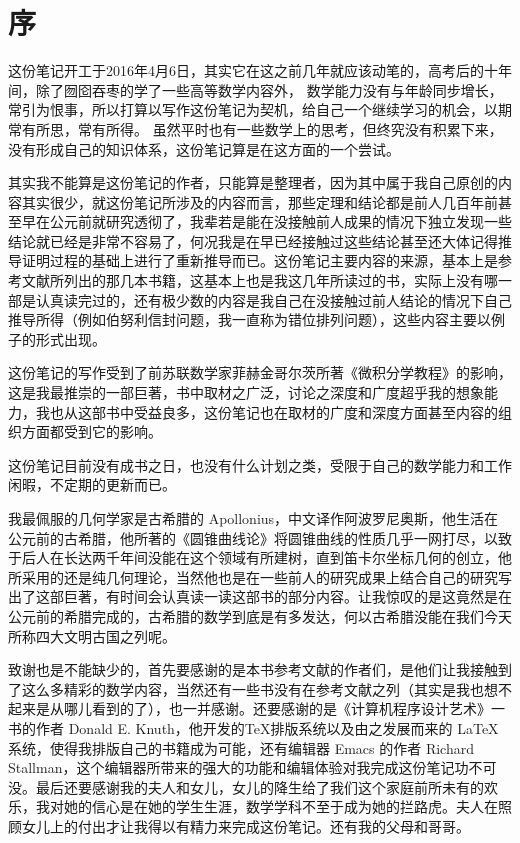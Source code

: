 
\chapter*{序}
\thispagestyle{empty}

这份笔记开工于2016年4月6日，其实它在这之前几年就应该动笔的，高考后的十年间，除了囫囵吞枣的学了一些高等数学内容外，
数学能力没有与年龄同步增长，常引为恨事，所以打算以写作这份笔记为契机，给自己一个继续学习的机会，以期常有所思，常有所得。
虽然平时也有一些数学上的思考，但终究没有积累下来，没有形成自己的知识体系，这份笔记算是在这方面的一个尝试。

其实我不能算是这份笔记的作者，只能算是整理者，因为其中属于我自己原创的内容其实很少，就这份笔记所涉及的内容而言，那些定理和结论都是前人几百年前甚至早在公元前就研究透彻了，我辈若是能在没接触前人成果的情况下独立发现一些结论就已经是非常不容易了，何况我是在早已经接触过这些结论甚至还大体记得推导证明过程的基础上进行了重新推导而已。这份笔记主要内容的来源，基本上是参考文献所列出的那几本书籍，这基本上也是我这几年所读过的书，实际上没有哪一部是认真读完过的，还有极少数的内容是我自己在没接触过前人结论的情况下自己推导所得（例如伯努利信封问题，我一直称为错位排列问题），这些内容主要以例子的形式出现。

这份笔记的写作受到了前苏联数学家菲赫金哥尔茨所著《微积分学教程》的影响，这是我最推崇的一部巨著，书中取材之广泛，讨论之深度和广度超乎我的想象能力，我也从这部书中受益良多，这份笔记也在取材的广度和深度方面甚至内容的组织方面都受到它的影响。

这份笔记目前没有成书之日，也没有什么计划之类，受限于自己的数学能力和工作闲暇，不定期的更新而已。

我最佩服的几何学家是古希腊的 Apollonius，中文译作阿波罗尼奥斯，他生活在公元前的古希腊，他所著的《圆锥曲线论》将圆锥曲线的性质几乎一网打尽，以致于后人在长达两千年间没能在这个领域有所建树，直到笛卡尔坐标几何的创立，他所采用的还是纯几何理论，当然他也是在一些前人的研究成果上结合自己的研究写出了这部巨著，有时间会认真读一读这部书的部分内容。让我惊叹的是这竟然是在公元前的希腊完成的，古希腊的数学到底是有多发达，何以古希腊没能在我们今天所称四大文明古国之列呢。

致谢也是不能缺少的，首先要感谢的是本书参考文献的作者们，是他们让我接触到了这么多精彩的数学内容，当然还有一些书没有在参考文献之列（其实是我也想不起来是从哪儿看到的了），也一并感谢。还要感谢的是《计算机程序设计艺术》一书的作者 Donald E. Knuth，他开发的\TeX 排版系统以及由之发展而来的 \LaTeX 系统，使得我排版自己的书籍成为可能，还有编辑器 Emacs 的作者 Richard Stallman，这个编辑器所带来的强大的功能和编辑体验对我完成这份笔记功不可没。最后还要感谢我的夫人和女儿，女儿的降生给了我们这个家庭前所未有的欢乐，我对她的信心是在她的学生生涯，数学学科不至于成为她的拦路虎。夫人在照顾女儿上的付出才让我得以有精力来完成这份笔记。还有我的父母和哥哥。

